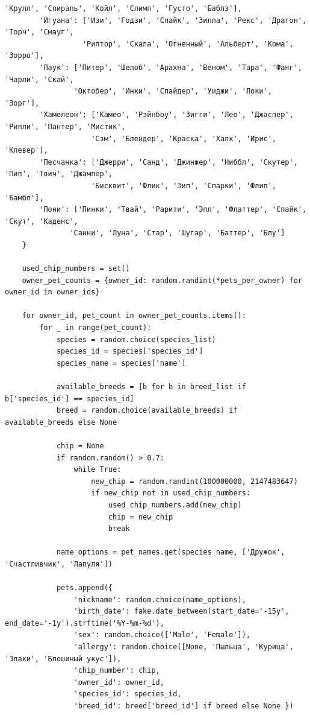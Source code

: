 \documentclass[a4paper]{article}
\begin{document}
\begin{lstlisting}[caption = Генерация значений для таблиц, basicstyle= \scriptsize \ttfamily]
                  'Крулл', 'Спираль', 'Койл', 'Слимп', 'Густо', 'Баблз'],
        'Игуана': ['Изи', 'Годзи', 'Спайк', 'Зилла', 'Рекс', 'Драгон', 'Торч', 'Смауг',
                  'Риптор', 'Скала', 'Огненный', 'Альберт', 'Кома', 'Зорро'],
        'Паук': ['Питер', 'Шелоб', 'Арахна', 'Веном', 'Тара', 'Фанг', 'Чарли', 'Скай',
                'Октобер', 'Инки', 'Спайдер', 'Уиджи', 'Локи', 'Зорг'],
        'Хамелеон': ['Камео', 'Рэйнбоу', 'Зигги', 'Лео', 'Джаспер', 'Рипли', 'Пантер', 'Мистик',
                    'Сэм', 'Блендер', 'Краска', 'Халк', 'Ирис', 'Клевер'],
        'Песчанка': ['Джерри', 'Санд', 'Джинжер', 'Ниббл', 'Скутер', 'Пип', 'Твич', 'Джампер',
                    'Бисквит', 'Флик', 'Зип', 'Спарки', 'Флип', 'Бамбл'],
        'Пони': ['Пинки', 'Твай', 'Рарити', 'Эпл', 'Флаттер', 'Спайк', 'Скут', 'Каденс',
               'Санни', 'Луна', 'Стар', 'Шугар', 'Баттер', 'Блу']
    }
    
    used_chip_numbers = set()
    owner_pet_counts = {owner_id: random.randint(*pets_per_owner) for owner_id in owner_ids}
    
    for owner_id, pet_count in owner_pet_counts.items():
        for _ in range(pet_count):
            species = random.choice(species_list)
            species_id = species['species_id']
            species_name = species['name']
            
            available_breeds = [b for b in breed_list if b['species_id'] == species_id]
            breed = random.choice(available_breeds) if available_breeds else None

            chip = None
            if random.random() > 0.7:
                while True:
                    new_chip = random.randint(100000000, 2147483647)
                    if new_chip not in used_chip_numbers:
                        used_chip_numbers.add(new_chip)
                        chip = new_chip
                        break
            
            name_options = pet_names.get(species_name, ['Дружок', 'Счастливчик', 'Лапуля'])
            
            pets.append({
                'nickname': random.choice(name_options),
                'birth_date': fake.date_between(start_date='-15y', end_date='-1y').strftime('%Y-%m-%d'),
                'sex': random.choice(['Male', 'Female']),
                'allergy': random.choice([None, 'Пыльца', 'Курица', 'Злаки', 'Блошиный укус']),
                'chip_number': chip,
                'owner_id': owner_id,
                'species_id': species_id,
                'breed_id': breed['breed_id'] if breed else None })
    

\end{lstlisting}
\end{document}
